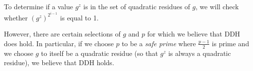 To determine if a value $g^z$ is in the set of quadratic residues of $g$, we will check whether $(g^z)^{2^{i-1}}$ is equal to 1.

However, there are certain selections of $g$ and $p$ for which we believe that DDH does hold. In particular, if we choose $p$ to be a \emph{safe prime} where $\frac{p-1}{2}$ is prime and we choose $g$ to itself be a quadratic residue (so that $g^z$ is always a quadratic residue), we believe that DDH holds.
